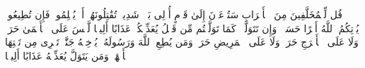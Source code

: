 \stopbuffer%
\startbuffer[\q:48:16]
قُل لِّلۡمُخَلَّفِینَ مِنَ ٱلۡأَعۡرَابِ سَتُدۡعَوۡنَ إِلَىٰ قَوۡمٍ أُو۟لِی بَأۡسࣲ شَدِیدࣲ تُقَٰتِلُونَهُمۡ أَوۡ یُسۡلِمُونَۖ فَإِن تُطِیعُوا۟ یُؤۡتِكُمُ ٱللَّهُ أَجۡرًا حَسَنࣰاۖ وَإِن تَتَوَلَّوۡا۟ كَمَا تَوَلَّیۡتُم مِّن قَبۡلُ یُعَذِّبۡكُمۡ عَذَابًا أَلِیمࣰا%
\stopbuffer%
\startbuffer[\q:48:17]
لَّیۡسَ عَلَى ٱلۡأَعۡمَىٰ حَرَجࣱ وَلَا عَلَى ٱلۡأَعۡرَجِ حَرَجࣱ وَلَا عَلَى ٱلۡمَرِیضِ حَرَجࣱۗ وَمَن یُطِعِ ٱللَّهَ وَرَسُولَهُۥ یُدۡخِلۡهُ جَنَّٰتࣲ تَجۡرِی مِن تَحۡتِهَا ٱلۡأَنۡهَٰرُۖ وَمَن یَتَوَلَّ یُعَذِّبۡهُ عَذَابًا أَلِیمࣰا%
\stopbuffer%
